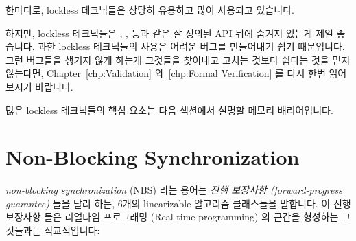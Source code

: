 한마디로, lockless 테크닉들은 상당히 유용하고 많이 사용되고 있습니다.

하지만, lockless 테크닉들은 , ,
 등과 같은 잘 정의된 API 뒤에 숨겨져 있는게 제일 좋습니다.
과한 lockless 테크닉들의 사용은 어려운 버그를 만들어내기 쉽기 때문입니다.
그런 버그들을 생기지 않게 하는게 그것들을 찾아내고 고치는 것보다 쉽다는 것을
믿지 않는다면,
Chapter~\ref{chp:Validation} 와~\ref{chp:Formal Verification} 를 다시 한번
읽어보시기 바랍니다.

많은 lockless 테크닉들의 핵심 요소는 다음 섹션에서 설명할 메모리 배리어입니다.
\iffalse

In short, lockless techniques are quite useful and are heavily used.

However, it is best if lockless techniques are hidden behind a
well-defined API, such as the \co{inc_count()}, \co{memblock_alloc()},
\co{rcu_read_lock()}, and so on.
The reason for this is that undisciplined use of lockless techniques
is a good way to create difficult bugs.
If you don't believe that avoiding such bugs is easier than finding
and fixing them, please re-read
Chapters~\ref{chp:Validation} and~\ref{chp:Formal Verification}.

A key component of many lockless techniques is the memory barrier,
which is described in the following section.
\fi



\section{Non-Blocking Synchronization}
\label{sec:advsync:Non-Blocking Synchronization}

\emph{non-blocking synchronization} (NBS) 라는 용어는
\emph{진행 보장사항 (forward-progress guarantee)} 들을 달리 하는, 6개의
linearizable 알고리즘 클래스들을 말합니다.
이 진행 보장사항 들은 리얼타임 프로그래밍 (Real-time programming) 의 근간을
형성하는 그것들과는 직교적입니다:
\iffalse

The term \emph{non-blocking synchronization} (NBS) describes six classes of
linearizable algorithms with differing \emph{forward-progress guarantees}.
These forward-progress guarantees are orthogonal to those that form the
basis of real-time programming:
\fi

